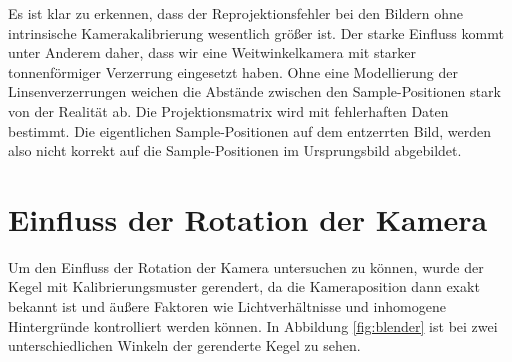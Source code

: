 Es ist klar zu erkennen, dass der Reprojektionsfehler bei den Bildern ohne intrinsische Kamerakalibrierung wesentlich größer ist. Der starke Einfluss kommt unter Anderem daher, dass wir eine Weitwinkelkamera mit starker tonnenförmiger Verzerrung eingesetzt haben. Ohne eine Modellierung der Linsenverzerrungen weichen die Abstände zwischen den Sample-Positionen stark von der Realität ab. Die Projektionsmatrix wird mit fehlerhaften Daten bestimmt. Die eigentlichen Sample-Positionen auf dem entzerrten Bild, werden also nicht korrekt auf die Sample-Positionen im Ursprungsbild abgebildet. 

\section{Einfluss der Rotation der Kamera}
Um den Einfluss der Rotation der Kamera untersuchen zu können, wurde der Kegel mit Kalibrierungsmuster gerendert, da die Kameraposition dann exakt bekannt ist und äußere Faktoren wie Lichtverhältnisse und inhomogene Hintergründe kontrolliert werden können. In Abbildung \ref{fig:blender} ist bei zwei unterschiedlichen Winkeln der gerenderte Kegel zu sehen. 

